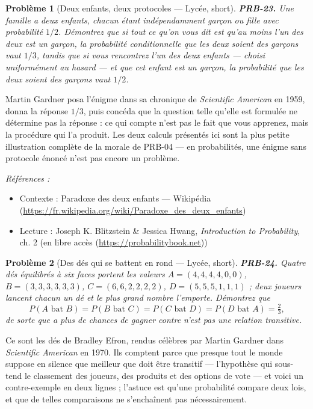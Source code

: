 \documentclass[11pt]{article}
\newtheorem{problem}{Problème}
\newenvironment{refs}{\par\small\noindent\emph{Références :}\begin{itemize}\setlength\itemsep{0pt}}{\end{itemize}\normalsize}
\begin{document}
\bigskip

\begin{problem}[{Deux enfants, deux protocoles --- Lycée, short}]
\textbf{PRB-23.} Une famille a deux enfants, chacun étant indépendamment
garçon ou fille avec probabilité $ 1/2 $. Démontrez que si tout ce qu'on vous dit est qu'au moins
l'un des deux est un garçon, la probabilité conditionnelle que les deux soient des garçons vaut
$ 1/3 $, tandis que si vous rencontrez l'un des deux enfants --- choisi uniformément au hasard --- et
que cet enfant est un garçon, la probabilité que les deux soient des garçons vaut $ 1/2 $.
\end{problem}

\noindent Martin Gardner posa l'énigme dans sa chronique de \textit{Scientific American} en
1959, donna la réponse $ 1/3 $, puis concéda que la question telle qu'elle est formulée ne
détermine pas la réponse : ce qui compte n'est pas le fait que vous apprenez, mais la procédure
qui l'a produit. Les deux calculs présentés ici sont la plus petite illustration complète de la
morale de PRB-04 --- en probabilités, une énigme sans protocole énoncé n'est pas encore un
problème.

\begin{refs}
\item Contexte : Paradoxe des deux enfants --- Wikipédia (\url{https://fr.wikipedia.org/wiki/Paradoxe_des_deux_enfants})
\item Lecture : Joseph K. Blitzstein \& Jessica Hwang, \textit{Introduction to Probability}, ch. 2 (en libre accès (\url{https://probabilitybook.net}))
\end{refs}

\bigskip

\begin{problem}[{Des dés qui se battent en rond --- Lycée, short}]
\textbf{PRB-24.} Quatre dés équilibrés à six faces portent les valeurs
$ A = (4,4,4,4,0,0) $, $ B = (3,3,3,3,3,3) $, $ C = (6,6,2,2,2,2) $,
$ D = (5,5,5,1,1,1) $ ; deux joueurs lancent chacun un dé et le plus grand nombre l'emporte.
Démontrez que
\[ P(A \text{ bat } B) = P(B \text{ bat } C) = P(C \text{ bat } D)
 = P(D \text{ bat } A) = \tfrac{2}{3}, \]
de sorte que \og{} a plus de chances de gagner contre \fg{} n'est pas une relation transitive.
\end{problem}

\noindent Ce sont les dés de Bradley Efron, rendus célèbres par Martin Gardner dans
\textit{Scientific American} en 1970. Ils comptent parce que presque tout le monde suppose en
silence que \og{} meilleur que \fg{} doit être transitif --- l'hypothèse qui sous-tend le classement des
joueurs, des produits et des options de vote --- et voici un contre-exemple en deux lignes ; l'astuce
est qu'une probabilité compare deux lois, et que de telles comparaisons ne s'enchaînent pas
nécessairement.
\end{document}
